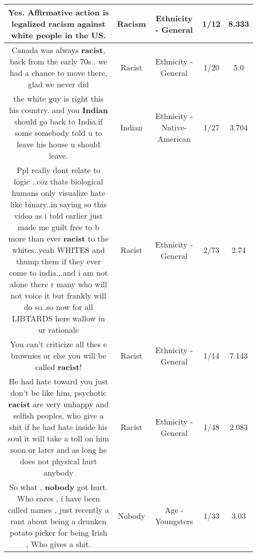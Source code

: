 \documentclass[11pt]{article}
\newlength\mylength
\begin{document}
\begin{center}
\begin{longtable}{|C{.65\mylength}|C{.30\mylength}|C{.12\mylength}|C{.12\mylength}|C{.12\mylength}|}
  \small Yes. Affirmative action is legalized \textbf{racism} against white people in the US.\normalsize   & Racism & Ethnicity - General & 1/12 & 8.333 \\  \hline
  \small Canada was always \textbf{racist}, back from the early 70s.. we had a chance to move there, glad we never did\normalsize   & Racist & Ethnicity - General & 1/20 & 5.0 \\  \hline
  \small the white guy is right this his country. and you \textbf{Indian} should go back to India.if some somebody told u to leave his house u should leave.\normalsize   & Indian & Ethnicity - Native-American & 1/27 & 3.704 \\  \hline
  \small Ppl really dont relate to logic ..coz thats biological humans only visualize hate like binary..in saying so  this video as i told earlier just made me guilt free to b more than ever \textbf{racist} to the whites..yeah WHITES  and thump them if they ever come to india...and i am not alone there r many who will not voice it but frankly will do so..so now for all LIBTARDS here wallow in ur rationale\normalsize   & Racist & Ethnicity - General & 2/73 & 2.74 \\  \hline
  \small You can't criticize all thes e brownies or else you will be called \textbf{racist}!\normalsize   & Racist & Ethnicity - General & 1/14 & 7.143 \\  \hline
  \small He had hate toward you just don't be like him, psychotic \textbf{racist} are very unhappy and selfish peoples, who give a shit if he had hate inside his soul it will take a toll on him soon or later and as long he does not physical hurt anybody\normalsize   & Racist & Ethnicity - General & 1/48 & 2.083 \\  \hline
  \small So what , \textbf{nobody} got hurt. Who cares , i have been called names , just recently a rant about being a drunken potato picker for being Irish , Who gives a shit.\normalsize   & Nobody & Age - Youngsters & 1/33 & 3.03 \\  \hline

\end{longtable}
\end{center}
\end{document}

